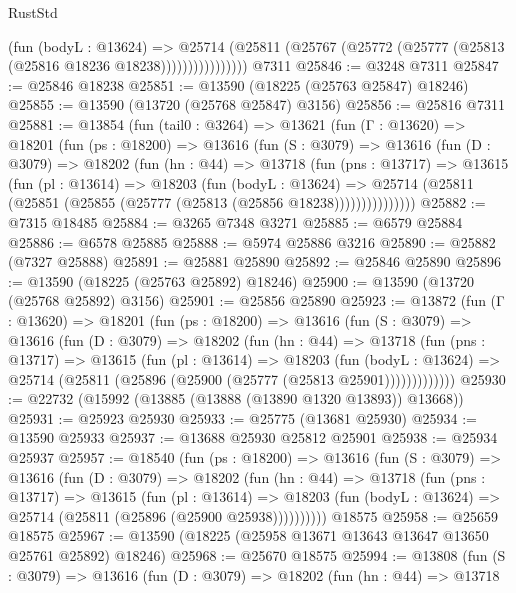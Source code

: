 \begin{lexlean}{RustStd}
\begin{coremodule}
                      (fun (bodyL : @13624) =>
                      @25714
                        (@25811
                          (@25767 (@25772 (@25777 (@25813 (@25816 @18236 @18238))))))))))))))))
    @7311
@25846 := @3248 @7311
@25847 := @25846 @18238
@25851 := @13590 (@18225 (@25763 @25847) @18246)
@25855 := @13590 (@13720 (@25768 @25847) @3156)
@25856 := @25816 @7311
@25881 := @13854
    (fun (tail0 : @3264) =>
    @13621
      (fun (Γ : @13620) =>
      @18201
        (fun (ps : @18200) =>
        @13616
          (fun (S : @3079) =>
          @13616
            (fun (D : @3079) =>
            @18202
              (fun (hn : @44) =>
              @13718
                (fun (pns : @13717) =>
                @13615
                  (fun (pl : @13614) =>
                  @18203
                    (fun (bodyL : @13624) =>
                    @25714 (@25811 (@25851 (@25855 (@25777 (@25813 (@25856 @18238)))))))))))))))
@25882 := @7315 @18485
@25884 := @3265 @7348 @3271
@25885 := @6579 @25884
@25886 := @6578 @25885
@25888 := @5974 @25886 @3216
@25890 := @25882 (@7327 @25888)
@25891 := @25881 @25890
@25892 := @25846 @25890
@25896 := @13590 (@18225 (@25763 @25892) @18246)
@25900 := @13590 (@13720 (@25768 @25892) @3156)
@25901 := @25856 @25890
@25923 := @13872
    (fun (Γ : @13620) =>
    @18201
      (fun (ps : @18200) =>
      @13616
        (fun (S : @3079) =>
        @13616
          (fun (D : @3079) =>
          @18202
            (fun (hn : @44) =>
            @13718
              (fun (pns : @13717) =>
              @13615
                (fun (pl : @13614) =>
                @18203
                  (fun (bodyL : @13624) =>
                  @25714 (@25811 (@25896 (@25900 (@25777 (@25813 @25901)))))))))))))
@25930 := @22732 (@15992 (@13885 (@13888 (@13890 @1320 @13893)) @13668))
@25931 := @25923 @25930
@25933 := @25775 (@13681 @25930)
@25934 := @13590 @25933
@25937 := @13688 @25930 @25812 @25901
@25938 := @25934 @25937
@25957 := @18540
    (fun (ps : @18200) =>
    @13616
      (fun (S : @3079) =>
      @13616
        (fun (D : @3079) =>
        @18202
          (fun (hn : @44) =>
          @13718
            (fun (pns : @13717) =>
            @13615
              (fun (pl : @13614) =>
              @18203 (fun (bodyL : @13624) => @25714 (@25811 (@25896 (@25900 @25938))))))))))
    @18575
@25958 := @25659 @18575
@25967 := @13590 (@18225 (@25958 @13671 @13643 @13647 @13650 @25761 @25892) @18246)
@25968 := @25670 @18575
@25994 := @13808
    (fun (S : @3079) =>
    @13616
      (fun (D : @3079) =>
      @18202
        (fun (hn : @44) =>
        @13718

\end{coremodule}
\end{lexlean}
